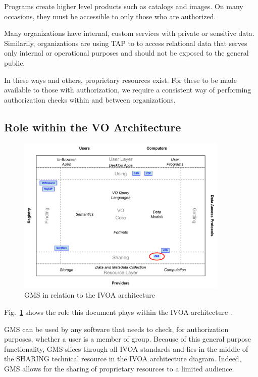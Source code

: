 \documentclass[11pt,a4paper]{ivoa}
\begin{document}
Programs create higher level products such as catalogs and images.  On many occasions, they must be accessible to only those who are authorized.

Many organizations have internal, custom services with private or sensitive data.  Similarily, organizations are using TAP to to access relational data that serves only internal or operational purposes and should not be exposed to the general public.

In these ways and others, proprietary resources exist.  For these to be made available to those with authorization, we require a consistent way of performing authorization checks within and between organizations.

\subsection{Role within the VO Architecture}
\label{subsec:roleinarch}

\begin{figure}
\centering

\includegraphics[width=0.9\textwidth]{role_diagram.pdf}
\caption{GMS in relation to the IVOA architecture}
\label{fig:archdiag}
\end{figure}

Fig.~\ref{fig:archdiag} shows the role this document plays within the
IVOA architecture \citep{note:VOARCH}.

GMS can be used by any software that needs to check, for authorization purposes, whether a user is a member of group.  Because of this general purpose functionality, GMS slices through all IVOA standards and lies in the middle of the SHARING technical resource in the IVOA architecture diagram.  Indeed, GMS allows for the sharing of proprietary resources to a limited audience.
\end{document}

